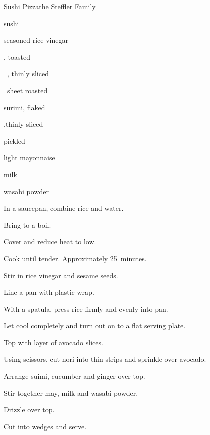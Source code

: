 \begin{recipe}{Sushi Pizza}{the Steffler Family}{}

\begin{ingredients}
\item {} sushi 
\item \C{\quarter} seasoned rice vinegar
\item {} , toasted
\item \half~, thinly sliced
\item \half~sheet roasted 
\item \C{\threequarter} surimi, flaked
\item \C{\half} ,thinly sliced
\item {} pickled 
\item {} light mayonnaise
\item {} milk
\item {} wasabi powder
\end{ingredients}

\begin{directions}
\item In a saucepan, combine rice and \C{1\quarter} water.
\item Bring to a boil.
\item Cover and reduce heat to low.
\item Cook until tender. Approximately 25~minutes.
\item Stir in rice vinegar and sesame seeds.
\item Line a pan with plastic wrap.
\item With a spatula, press rice firmly and evenly into pan.
\item Let cool completely and turn out on to a flat serving plate.
\item Top with layer of avocado slices.
\item Using scissors, cut nori into thin strips and sprinkle over avocado.
\item Arrange suimi, cucumber and ginger over top.
\item Stir together may, milk and wasabi powder.
\item Drizzle over top.
\item Cut into wedges and serve.
\end{directions}
\end{recipe}
